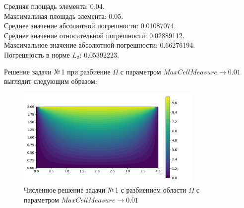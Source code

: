 \documentclass[12pt, a4paper]{article}
\begin{document}
			\noindent
			Средняя площадь элемента:  0.04. \\
			Максимальная площадь элемента:  0.05. \\
			Среднее значение абсолютной погрешности: 	0.01087074.\\
			Среднее значение относительной погрешности: 0.02889112. \\
			Максимальное значение абсолютной погрешности: 0.66276194. \\			
			Погрешность в норме $L_2$: 0.05392223. \\
			
			
			\newpage
			
			Решение задачи №\,1 при разбиение $\Omega$ с параметром $MaxCellMeasure \rightarrow 0.01$ выглядит следующим образом: 
			\vspace*{-5mm}
			\begin{figure}[!h]
				\centering
				\includegraphics[width=0.8\textwidth]{rect_dirichlet_only_001_calfem.png}
				\caption{Численное решение задачи №\,1 с разбиением области $\Omega$ с параметром $MaxCellMeasure \rightarrow 0.01$}
				\label{fig:dom_rect_001}
			\end{figure}
			
\end{document}
